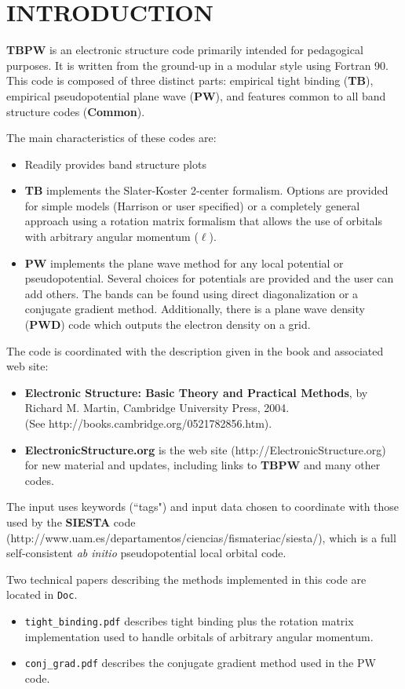 \section{INTRODUCTION}

{\bf TBPW} is an electronic structure code primarily intended for
pedagogical purposes. It is written from the ground-up in a
modular style using Fortran 90. This code is composed of three
distinct parts: empirical tight binding ({\bf TB}), empirical
pseudopotential plane wave ({\bf PW}), and features common to all
band structure codes ({\bf Common}).

The main characteristics of these codes are:
\begin{itemize}
\item Readily provides band structure plots

\item {\bf TB} implements the Slater-Koster 2-center formalism.
Options are provided for simple models (Harrison or user
specified) or a completely general approach using a rotation
matrix formalism that allows the use of orbitals with arbitrary
angular momentum ($\ell$).

\item {\bf PW} implements the plane wave method for any local potential or
pseudopotential.  Several choices for potentials are provided and the
user can add others.  The bands can be found using direct
diagonalization or a conjugate gradient method. Additionally, there is a
plane wave density ({\bf PWD}) code which outputs the electron density
on a grid.
\end{itemize}

The code is coordinated with the description given in the book and
associated web site:
\begin{itemize}
\item {\bf Electronic Structure: Basic Theory and Practical
Methods}, by Richard M. Martin, Cambridge University Press,
2004.\\
(See http://books.cambridge.org/0521782856.htm).

\item {\bf ElectronicStructure.org}  is the web site
(http://ElectronicStructure.org) for new material and updates,
including links to {\bf TBPW} and many other codes.
\end{itemize}

The input uses keywords (``tags") and input data chosen to
coordinate with those used by the {\bf SIESTA} code
(http://www.uam.es/departamentos/ciencias/fismateriac/siesta/),
which is a full self-consistent {\it ab initio} pseudopotential local
orbital code.

 Two technical papers
describing the methods implemented in this code are located in
{\tt Doc}.
\begin{itemize}
\item {\tt tight\_binding.pdf} describes tight binding
plus the rotation matrix implementation used to handle orbitals of
arbitrary angular momentum.
\item {\tt conj\_grad.pdf} describes the conjugate gradient method used
in the PW code.
\end{itemize}

